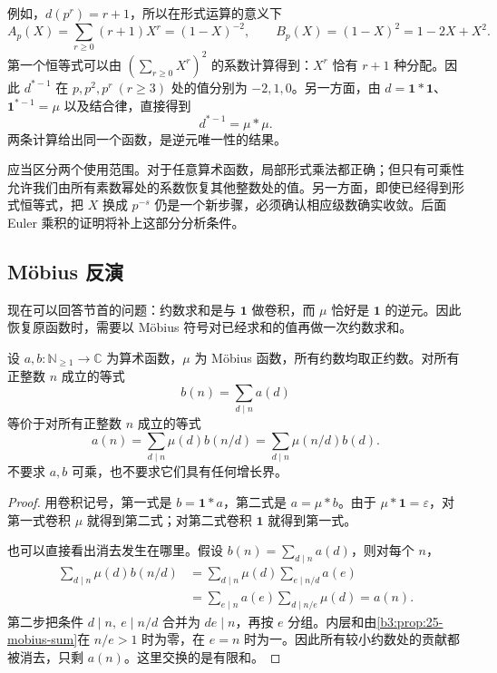 例如，\(d(p^r)=r+1\)，所以在形式运算的意义下
\[
 A_p(X)=\sum_{r\ge0}(r+1)X^r=(1-X)^{-2},
 \qquad B_p(X)=(1-X)^2=1-2X+X^2.
\]
第一个恒等式可以由 \((\sum_{r\ge0}X^r)^2\) 的系数计算得到：\(X^r\) 恰有 \(r+1\) 种分配。因此 \(d^{*-1}\) 在 \(p,p^2,p^r\ (r\ge3)\) 处的值分别为 \(-2,1,0\)。另一方面，由 \(d=\mathbf1*\mathbf1\)、\(\mathbf1^{*-1}=\mu\) 以及结合律，直接得到
\[
 d^{*-1}=\mu*\mu.
\]
两条计算给出同一个函数，是逆元唯一性的结果。

应当区分两个使用范围。对于任意算术函数，局部形式乘法都正确；但只有可乘性允许我们由所有素数幂处的系数恢复其他整数处的值。另一方面，即使已经得到形式恒等式，把 \(X\) 换成 \(p^{-s}\) 仍是一个新步骤，必须确认相应级数确实收敛。后面 Euler 乘积的证明将补上这部分分析条件。

\subsection{Möbius 反演}
\label{b3:subsec:250204}

现在可以回答节首的问题：约数求和是与 \(\mathbf1\) 做卷积，而 \(\mu\) 恰好是 \(\mathbf1\) 的逆元。因此恢复原函数时，需要以 Möbius 符号对已经求和的值再做一次约数求和。

\begin{theorem}[Möbius 反演]\label{b3:thm:25-mobius-inversion}
设 \(a,b:\mathbb N_{\ge1}\to\mathbb C\) 为算术函数，\(\mu\) 为 Möbius 函数，所有约数均取正约数。对所有正整数 \(n\) 成立的等式
\[
 b(n)=\sum_{d\mid n}a(d)
\]
等价于对所有正整数 \(n\) 成立的等式
\[
 a(n)=\sum_{d\mid n}\mu(d)b(n/d)
     =\sum_{d\mid n}\mu(n/d)b(d).
\]
不要求 \(a,b\) 可乘，也不要求它们具有任何增长界。
\end{theorem}
\begin{proof}
用卷积记号，第一式是 \(b=\mathbf1*a\)，第二式是 \(a=\mu*b\)。由于 \(\mu*\mathbf1=\varepsilon\)，对第一式卷积 \(\mu\) 就得到第二式；对第二式卷积 \(\mathbf1\) 就得到第一式。

也可以直接看出消去发生在哪里。假设 \(b(n)=\sum_{d\mid n}a(d)\)，则对每个 \(n\)，
\[
 \begin{aligned}
 \sum_{d\mid n}\mu(d)b(n/d)
 &=\sum_{d\mid n}\mu(d)\sum_{e\mid n/d}a(e)\\
 &=\sum_{e\mid n}a(e)\sum_{d\mid n/e}\mu(d)
 =a(n).
 \end{aligned}
\]
第二步把条件 \(d\mid n,\ e\mid n/d\) 合并为 \(de\mid n\)，再按 \(e\) 分组。内层和由\cref{b3:prop:25-mobius-sum}在 \(n/e>1\) 时为零，在 \(e=n\) 时为一。因此所有较小约数处的贡献都被消去，只剩 \(a(n)\)。这里交换的是有限和。
\end{proof}

